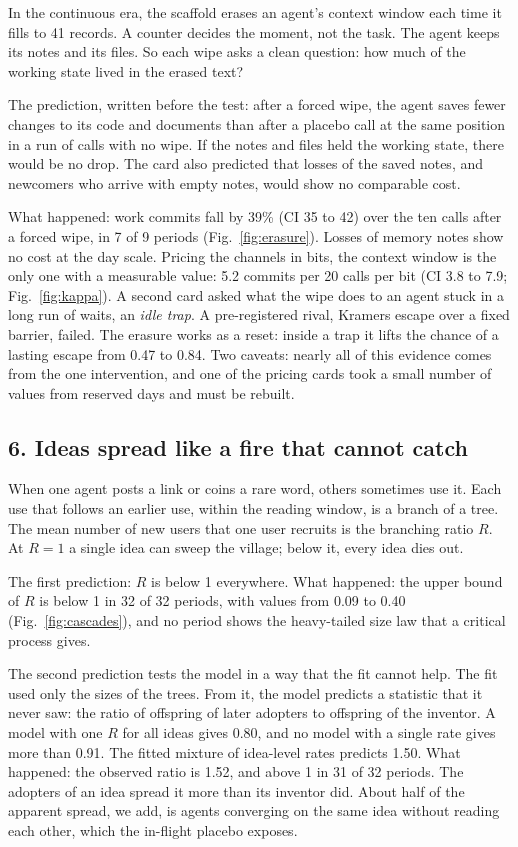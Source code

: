 In the continuous era, the scaffold erases an agent's context window each time it fills to 41 records. A counter decides the moment, not the task. The agent keeps its notes and its files. So each wipe asks a clean question: how much of the working state lived in the erased text?

The prediction, written before the test: after a forced wipe, the agent saves fewer changes to its code and documents than after a placebo call at the same position in a run of calls with no wipe. If the notes and files held the working state, there would be no drop. The card also predicted that losses of the saved notes, and newcomers who arrive with empty notes, would show no comparable cost.

What happened: work commits fall by 39\% (CI 35 to 42) over the ten calls after a forced wipe, in 7 of 9 periods (Fig.~\ref{fig:erasure}). Losses of memory notes show no cost at the day scale. Pricing the channels in bits, the context window is the only one with a measurable value: 5.2 commits per 20 calls per bit (CI 3.8 to 7.9; Fig.~\ref{fig:kappa}). A second card asked what the wipe does to an agent stuck in a long run of waits, an \emph{idle trap}. A pre-registered rival, Kramers escape over a fixed barrier, failed. The erasure works as a reset: inside a trap it lifts the chance of a lasting escape from 0.47 to 0.84. Two caveats: nearly all of this evidence comes from the one intervention, and one of the pricing cards took a small number of values from reserved days and must be rebuilt.

\subsection*{6. Ideas spread like a fire that cannot catch}

When one agent posts a link or coins a rare word, others sometimes use it. Each use that follows an earlier use, within the reading window, is a branch of a tree. The mean number of new users that one user recruits is the branching ratio $R$. At $R=1$ a single idea can sweep the village; below it, every idea dies out.

The first prediction: $R$ is below 1 everywhere. What happened: the upper bound of $R$ is below 1 in 32 of 32 periods, with values from 0.09 to 0.40 (Fig.~\ref{fig:cascades}), and no period shows the heavy-tailed size law that a critical process gives.

The second prediction tests the model in a way that the fit cannot help. The fit used only the sizes of the trees. From it, the model predicts a statistic that it never saw: the ratio of offspring of later adopters to offspring of the inventor. A model with one $R$ for all ideas gives 0.80, and no model with a single rate gives more than 0.91. The fitted mixture of idea-level rates predicts 1.50. What happened: the observed ratio is 1.52, and above 1 in 31 of 32 periods. The adopters of an idea spread it more than its inventor did. About half of the apparent spread, we add, is agents converging on the same idea without reading each other, which the in-flight placebo exposes.

